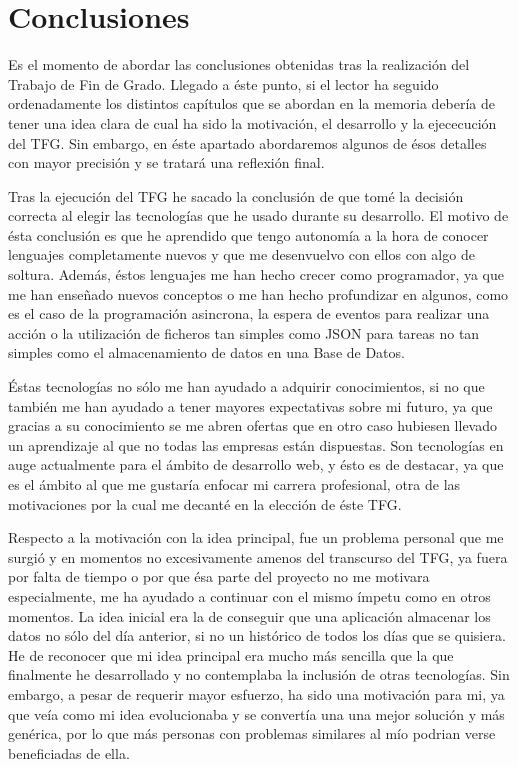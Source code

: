 \documentclass[11pt,openany]{book}
\begin{document}
\chapter{Conclusiones}

Es el momento de abordar las conclusiones obtenidas tras la realización del Trabajo de Fin de Grado. Llegado a éste punto, si el lector ha seguido ordenadamente los distintos capítulos que se abordan en la memoria debería de tener una idea clara de cual ha sido la motivación, el desarrollo y la ejececución del TFG. Sin embargo, en éste apartado abordaremos algunos de ésos detalles con mayor precisión y se tratará una reflexión final.

Tras la ejecución del TFG he sacado la conclusión de que tomé la decisión correcta al elegir las tecnologías que he usado durante su desarrollo. El motivo de ésta conclusión es que he aprendido que tengo autonomía a la hora de conocer lenguajes completamente nuevos y que me desenvuelvo con ellos con algo de soltura. Además, éstos lenguajes me han hecho crecer como programador, ya que me han enseñado nuevos conceptos o me han hecho profundizar en algunos, como es el caso de la programación asincrona, la espera de eventos para realizar una acción o la utilización de ficheros tan simples como JSON para tareas no tan simples como el almacenamiento de datos en una Base de Datos.

Éstas tecnologías no sólo me han ayudado a adquirir conocimientos, si no que también me han ayudado a tener mayores expectativas sobre mi futuro, ya que gracias a su conocimiento se me abren ofertas que en otro caso hubiesen llevado un aprendizaje al que no todas las empresas están dispuestas. Son tecnologías en auge actualmente para el ámbito de desarrollo web, y ésto es de destacar, ya que es el ámbito al que me gustaría enfocar mi carrera profesional, otra de las motivaciones por la cual me decanté en la elección de éste TFG.

Respecto a la motivación con la idea principal, fue un problema personal que me surgió y en momentos no excesivamente amenos del transcurso del TFG, ya fuera por falta de tiempo o por que ésa parte del proyecto no me motivara especialmente, me ha ayudado a continuar con el mismo ímpetu como en otros momentos. La idea inicial era la de conseguir que una aplicación almacenar los datos no sólo del día anterior, si no un histórico de todos los días que se quisiera. He de reconocer que mi idea principal era mucho más sencilla que la que finalmente he desarrollado y no contemplaba la inclusión de otras tecnologías. Sin embargo, a pesar de requerir mayor esfuerzo, ha sido una motivación para mi, ya que veía como mi idea evolucionaba y se convertía una una mejor solución y más genérica, por lo que más personas con problemas similares al mío podrian verse beneficiadas de ella.
\end{document}
